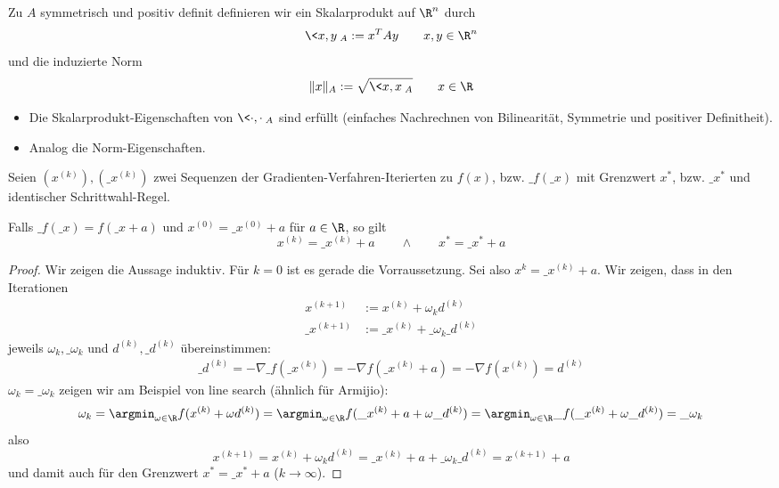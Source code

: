 \documentclass[11pt]{scrbook}
\begin{document}
\begin{df} \label{4.14}
	Zu $A$ symmetrisch und positiv definit definieren wir ein Skalarprodukt auf $\R^n$ durch
	\[
		\<x, y\>_A := x^T A y
		\qquad x,y \in \R^n
	\]
	und die induzierte Norm
	\[
		\|x\|_A := \sqrt{\<x,x\>_A}
		\qquad x \in \R
	\]
	\begin{note}
		\begin{itemize}
			\item
				Die Skalarprodukt-Eigenschaften von $\<\cdot, \cdot\>_A$ sind erfüllt (einfaches Nachrechnen von Bilinearität, Symmetrie und positiver Definitheit).
			\item
				Analog die Norm-Eigenschaften.
		\end{itemize}
	\end{note}
\end{df}

\begin{lem*}[Translationsinvarianz]
	Seien $(x^{(k)}), (\_x^{(k)})$ zwei Sequenzen der Gradienten-Verfahren-Iterierten zu $f(x)$, bzw. $\_f(\_x)$ mit Grenzwert $x^*$, bzw. $\_x^*$ und identischer Schrittwahl-Regel.

	Falls $\_f(\_x) = f(\_x + a)$ und $x^{(0)} = \_x^{(0)} + a$ für $a \in \R$, so gilt
	\[
		x^{(k)} = \_x^{(k)} + a
		\qquad \land \qquad
		x^* = \_x^* + a
	\]
	\begin{proof}
		Wir zeigen die Aussage induktiv.
		Für $k=0$ ist es gerade die Vorraussetzung.
		Sei also $x^{k} = \_x^{(k)} + a$.
		Wir zeigen, dass in den Iterationen
		\begin{align*}
			x^{(k+1)} &:= x^{(k)} + \omega_k d^{(k)} \\
			\_x^{(k+1)} &:= \_x^{(k)} + \_\omega_k \_d^{(k)}
		\end{align*}
		jeweils $\omega_k, \_\omega_k$ und $d^{(k)}, \_d^{(k)}$ übereinstimmen:
		\begin{align*}
			\_d^{(k)} = -\nabla \_f(\_x^{(k)}) = - \nabla f(\_x^{(k)} + a) = - \nabla f(x^{(k)}) = d^{(k)}
		\end{align*}
		$\omega_k = \_\omega_k$ zeigen wir am Beispiel von line search (ähnlich für Armijio):
		\[
			\omega_k = \argmin_{\omega\in\R} f(x^{(k)} + \omega d^{(k)}) = \argmin_{\omega\in \R} f(\_x^{(k)} + a + \omega \_d^{(k)})  = \argmin_{\omega\in \R} \_f(\_x^{(k)} + \omega \_d^{(k)}) = \_\omega_k
		\]
		also
		\[
			x^{(k+1)} = x^{(k)} + \omega_k d^{(k)} = \_x^{(k)} + a + \_\omega_k \_d^{(k)} = x^{(k+1)} +a
		\]
		und damit auch für den Grenzwert $x^* = \_x^* + a$ ($k \to \infty$).
	\end{proof}
\end{lem*}
\end{document}

